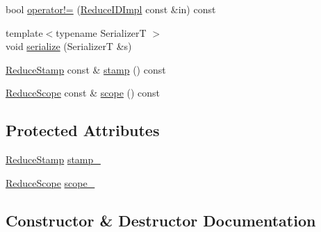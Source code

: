 \begin{DoxyCompactItemize}
\item 
bool \hyperlink{structvt_1_1collective_1_1reduce_1_1detail_1_1_reduce_i_d_impl_a9c445823cc9899b72bfcbb811b8d2603}{operator!=} (\hyperlink{structvt_1_1collective_1_1reduce_1_1detail_1_1_reduce_i_d_impl}{Reduce\+I\+D\+Impl} const \&in) const
\item 
{\footnotesize template$<$typename SerializerT $>$ }\\void \hyperlink{structvt_1_1collective_1_1reduce_1_1detail_1_1_reduce_i_d_impl_ad5b9cd7f62b54fca25932232cb6baebd}{serialize} (SerializerT \&s)
\item 
\hyperlink{namespacevt_1_1collective_1_1reduce_1_1detail_aacc1fcd729d934ba143fee3a943bf9e7}{Reduce\+Stamp} const  \& \hyperlink{structvt_1_1collective_1_1reduce_1_1detail_1_1_reduce_i_d_impl_a72f8c00e09eeb3106b162c9d5b06af05}{stamp} () const
\item 
\hyperlink{structvt_1_1collective_1_1reduce_1_1detail_1_1_reduce_scope}{Reduce\+Scope} const  \& \hyperlink{structvt_1_1collective_1_1reduce_1_1detail_1_1_reduce_i_d_impl_adc91349dad2340899b7a11df59528ef2}{scope} () const
\end{DoxyCompactItemize}
\subsection*{Protected Attributes}
\begin{DoxyCompactItemize}
\item 
\hyperlink{namespacevt_1_1collective_1_1reduce_1_1detail_aacc1fcd729d934ba143fee3a943bf9e7}{Reduce\+Stamp} \hyperlink{structvt_1_1collective_1_1reduce_1_1detail_1_1_reduce_i_d_impl_a84804f019298c0321847c09749ced0bb}{stamp\+\_\+}
\item 
\hyperlink{structvt_1_1collective_1_1reduce_1_1detail_1_1_reduce_scope}{Reduce\+Scope} \hyperlink{structvt_1_1collective_1_1reduce_1_1detail_1_1_reduce_i_d_impl_afc9cc556d4e84fe7c41944102a926d59}{scope\+\_\+}
\end{DoxyCompactItemize}


\subsection{Constructor \& Destructor Documentation}
\mbox{\label{structvt_1_1collective_1_1reduce_1_1detail_1_1_reduce_i_d_impl_a02838391cc76625466de53c8197baead}} 
